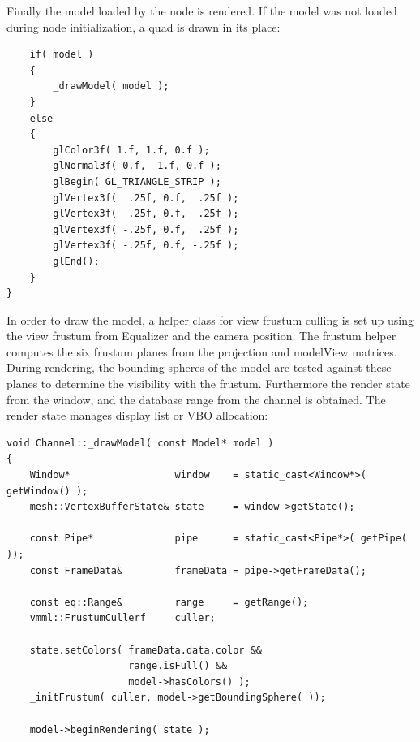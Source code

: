\documentclass[10pt,a4]{scrartcl}
\begin{document}
Finally the model loaded by the node is rendered. If the model was not
loaded during node initialization, a quad is drawn in its place:

{\footnotesize\begin{lstlisting}
    if( model )
    {
        _drawModel( model );
    }
    else
    {
        glColor3f( 1.f, 1.f, 0.f );
        glNormal3f( 0.f, -1.f, 0.f );
        glBegin( GL_TRIANGLE_STRIP );
        glVertex3f(  .25f, 0.f,  .25f );
        glVertex3f(  .25f, 0.f, -.25f );
        glVertex3f( -.25f, 0.f,  .25f );
        glVertex3f( -.25f, 0.f, -.25f );
        glEnd();
    }
}
\end{lstlisting}}

In order to draw the model, a helper class for view frustum culling is
set up using the view frustum from Equalizer and the camera
position. The frustum helper computes the six frustum planes from the
projection and modelView matrices. During rendering, the bounding
spheres of the model are tested against these planes to determine the
visibility with the frustum. Furthermore the render state from the
window, and the database range from the channel is obtained. The render
state manages display list or VBO allocation:

{\footnotesize\begin{lstlisting}
void Channel::_drawModel( const Model* model )
{
    Window*                  window    = static_cast<Window*>( getWindow() );
    mesh::VertexBufferState& state     = window->getState();

    const Pipe*              pipe      = static_cast<Pipe*>( getPipe( ));
    const FrameData&         frameData = pipe->getFrameData();

    const eq::Range&         range     = getRange();
    vmml::FrustumCullerf     culler;

    state.setColors( frameData.data.color && 
                     range.isFull() && 
                     model->hasColors() );
    _initFrustum( culler, model->getBoundingSphere( ));

    model->beginRendering( state );
        
\end{lstlisting}}
\end{document}
